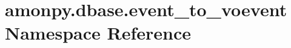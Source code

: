 \hypertarget{namespaceamonpy_1_1dbase_1_1event__to__voevent}{\section{amonpy.\-dbase.\-event\-\_\-to\-\_\-voevent Namespace Reference}
\label{namespaceamonpy_1_1dbase_1_1event__to__voevent}
}
